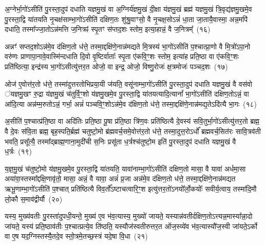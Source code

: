 {\anuvakamend[{वै त्रि॒वृदिति॑ पु॒रस्ता᳚थ्स॒व्यस्त्र॑योवि॒ꣳ॒श इति॑ सुव॒र्गो वै पञ्च॑ च}]}%

अ॒ग्नेर्भा॒गो॑\-ऽसीति॑ पु॒रस्ता॒दुप॑ दधाति यज्ञमु॒खं वा अ॒ग्निर्य॑ज्ञमु॒खं दी॒क्षा य॑ज्ञमु॒खं ब्रह्म॑ यज्ञमु॒खं त्रि॒वृद्य॑ज्ञमु॒खमे॒व पु॒रस्ता॒द्वि या॑तयति नृ॒चक्ष॑साम्भा॒गो॑\-ऽसीति॑ दक्षिण॒तः शु॑श्रु॒वाꣳसो॒ वै नृ॒चक्ष॒सो\-ऽन्नं॑ धा॒ता जा॒तायै॒वास्मा॒ अन्न॒मपि॑ दधाति॒ तस्मा᳚ज्जा॒तो\-ऽन्न॑मत्ति ज॒नित्रꣴ॑ स्पृ॒तꣳ स॑प्तद॒शः स्तोम॒ इत्या॒हान्नं॒ वै ज॒नित्रम्᳚~(१६)

अन्नꣳ॑ सप्तद॒शो\-ऽन्न॑मे॒व द॑क्षिण॒तो ध॑त्ते॒ तस्मा॒द्दक्षि॑णे॒नान्न॑मद्यते मि॒त्रस्य॑ भा॒गो॑\-ऽसीति॑ प॒श्चात्प्रा॒णो वै मि॒त्रो॑\-ऽपा॒नो वरु॑णः प्राणापा॒नावे॒वास्मि॑न्दधाति दि॒वो वृ॒ष्टिर्वाताः᳚ स्पृ॒ता ए॑कवि॒ꣳ॒शः स्तोम॒ इत्या॑ह प्रति॒ष्ठा वा ए॑कवि॒ꣳ॒शः प्रति॑ष्ठित्या॒ इन्द्र॑स्य भा॒गो॑\-ऽसीत्यु॑त्तर॒त ओजो॒ वा इन्द्र॒ ओजो॒ विष्णु॒रोजः॑ क्ष॒त्रमोजः॑ पञ्चद॒शः~(१७)

ओज॑ ए॒वोत्त॑र॒तो ध॑त्ते॒ तस्मा॑दुत्तरतोभिप्रया॒यी ज॑यति॒ वसू॑नाम्भा॒गो॑\-ऽसीति॑ पु॒रस्ता॒दुप॑ दधाति यज्ञमु॒खं वै वस॑वो ॑यज्ञमु॒खꣳ रु॒द्रा य॑ज्ञमु॒खं च॑तुर्वि॒ꣳ॒शो य॑ज्ञमु॒खमे॒व पु॒रस्ता॒द्वि या॑तयत्यादि॒त्यानां᳚ भा॒गो॑\-ऽसीति॑ दक्षिण॒तो\-ऽन्नं॒ वा आ॑दि॒त्या अन्न॑म्म॒रुतो\-ऽन्नं॒ गर्भा॒ अन्नं॑ पञ्चवि॒ꣳ॒शो\-ऽन्न॑मे॒व द॑क्षिण॒तो ध॑त्ते॒ तस्मा॒द्दक्षि॑णे॒नान्न॑मद्य॒ते\-ऽदि॑त्यै भा॒गः~(१८)

अ॒सीति॑ प॒श्चात्प्र॑ति॒ष्ठा वा अदि॑तिः प्रति॒ष्ठा पू॒षा प्र॑ति॒ष्ठा त्रि॑ण॒वः प्रति॑ष्ठित्यै दे॒वस्य॑ सवि॒तुर्भा॒गो॑\-ऽसीत्यु॑त्तर॒तो ब्रह्म॒ वै दे॒वः स॑वि॒ता ब्रह्म॒ बृह॒स्पति॒र्ब्रह्म॑ चतुष्टो॒मो ब्र॑ह्मवर्च॒समे॒वोत्त॑र॒तो ध॑त्ते॒ तस्मा॒दुत्त॒रो\-ऽर्धो᳚ ब्रह्मवर्च॒सित॑रः सावि॒त्रव॑ती भवति॒ प्रसू᳚त्यै॒ तस्मा᳚द्ब्राह्म॒णाना॒मुदी॑ची स॒निः प्रसू॑ता ध॒र्त्रश्च॑तुष्टो॒म इति॑ पु॒रस्ता॒दुप॑ दधाति यज्ञमु॒खं वै ध॒र्त्रः~(१९)

य॒ज्ञ॒मु॒खं च॑तुष्टो॒मो य॑ज्ञमु॒खमे॒व पु॒रस्ता॒द्वि या॑तयति॒ यावा॑नाम्भा॒गो॑\-ऽसीति॑ दक्षिण॒तो मासा॒ वै यावा॑ अर्धमा॒सा अया॑वा॒स्तस्मा᳚द्दक्षि॒णावृ॑तो॒ मासा॒ अन्नं॒ वै यावा॒ अन्नं॑ प्र॒जा अन्न॑मे॒व द॑क्षिण॒तो ध॑त्ते॒ तस्मा॒द्दक्षि॑णे॒नान्न॑मद्यत ऋभू॒णाम्भा॒गो॑\-ऽसीति॑ प॒श्चात् प्रति॑ष्ठित्यै विव॒र्तो᳚\-ऽष्टाचत्वारि॒ꣳ॒श इत्यु॑त्तर॒तो॑\-ऽनयो᳚र्लो॒कयोः᳚ सवीर्य॒त्वाय॒ तस्मा॑दि॒मौ लो॒कौ स॒माव॑द्वीर्यौ~(२०)

यस्य॒ मुख्य॑वतीः पु॒रस्ता॑दुपधी॒यन्ते॒ मुख्य॑ ए॒व भ॑व॒त्यास्य॒ मुख्यो॑ जायते॒ यस्यान्न॑वतीर्दक्षिण॒तो\-ऽत्त्यन्न॒मास्या᳚न्ना॒दो जा॑यते॒ यस्य॑ प्रति॒ष्ठाव॑तीः प॒श्चात्प्रत्ये॒व ति॑ष्ठति॒ यस्यौज॑स्वतीरुत्तर॒त ओ॑ज॒स्व्ये॑व भ॑व॒त्यास्यौ॑ज॒स्वी जा॑यते॒\-ऽर्को वा ए॒ष यद॒ग्निस्तस्यै॒तदे॒व स्तो॒त्रमे॒तच्छ॒स्त्रं यदे॒षा वि॒धा~(२१)


